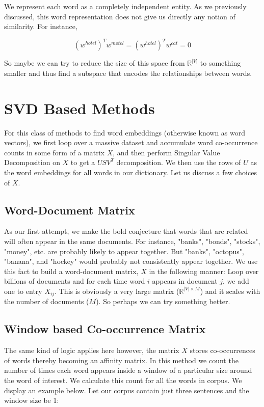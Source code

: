 \documentclass[nobib]{tufte-handout}
\begin{document}

We represent each word as a completely independent entity. As we previously discussed, this word representation does not give us directly any notion of similarity. For instance,

$$(w^{hotel})^Tw^{motel} = (w^{hotel})^Tw^{cat} = 0$$

So maybe we can try to reduce the size of this space from $\mathbb{R}^|V|$ to something smaller and thus find a subspace that encodes the relationships between words.

\section{SVD Based Methods}\label{sec:svdmethods}

For this class of methods to find word embeddings (otherwise known as word vectors), we first loop over a massive dataset and accumulate word co-occurrence counts in some form of a matrix $X$, and then perform Singular Value Decomposition on $X$ to get a $USV^T$ decomposition. We then use the rows of $U$ as the word embeddings for all words in our dictionary. Let us discuss a few choices of $X$.

\subsection{Word-Document Matrix}
As our first attempt, we make the bold conjecture that words that are related will often appear in the same documents. For instance, "banks", "bonds", "stocks", "money", etc. are probably likely to appear together. But "banks", "octopus", "banana", and "hockey" would probably not consistently appear together. We use this fact to build a word-document matrix, $X$ in the following manner: Loop over billions of documents and for each time word $i$ appears in document $j$, we add one to entry $X_{ij}$. This is obviously a very large matrix ($\mathbb{R}^{|V|\times M}$) and it scales with the number of documents ($M$). So perhaps we can try something better.



\subsection{Window based Co-occurrence Matrix}
The same kind of logic applies here however, the matrix $X$ stores co-occurrences of words thereby becoming an affinity matrix. In this method we count the number of times each word appears inside a window of a particular size around the word of interest. We calculate this count for all the words in corpus. We display an example below. Let our corpus contain just three sentences and the window size be 1:
\end{document}
